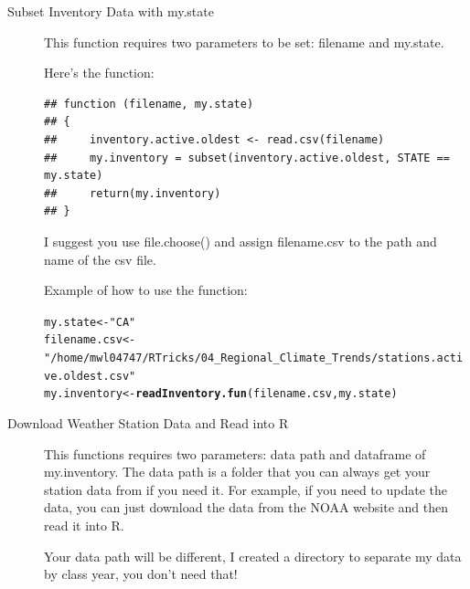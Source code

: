 \documentclass{article}\usepackage[]{graphicx}\usepackage[]{xcolor}
\makeatletter
\newcommand{\hlstr}[1]{\textcolor[rgb]{0.192,0.494,0.8}{#1}}%
\newcommand{\hlstd}[1]{\textcolor[rgb]{0.345,0.345,0.345}{#1}}%
\newcommand{\hlkwb}[1]{\textcolor[rgb]{0.69,0.353,0.396}{#1}}%
\newcommand{\hlkwd}[1]{\textcolor[rgb]{0.737,0.353,0.396}{\textbf{#1}}}%
\newenvironment{kframe}{%
 \def\at@end@of@kframe{}%
 \ifinner\ifhmode%
  \def\at@end@of@kframe{\end{minipage}}%
  \begin{minipage}{\columnwidth}%
 \fi\fi%
 \def\FrameCommand##1{\hskip\@totalleftmargin \hskip-\fboxsep
 \colorbox{shadecolor}{##1}\hskip-\fboxsep
     \hskip-\linewidth \hskip-\@totalleftmargin \hskip\columnwidth}%
 \MakeFramed {\advance\hsize-\width
   \@totalleftmargin\z@ \linewidth\hsize
   \@setminipage}}%
 {\par\unskip\endMakeFramed%
 \at@end@of@kframe}
\newenvironment{knitrout}{}{} %
\makeatother
\begin{document}
\begin{description}

\item[Subset Inventory Data with my.state]  

This function requires two parameters to be set: filename and my.state. 

Here's the function:

\begin{knitrout}
\color{fgcolor}\begin{kframe}
\begin{verbatim}
## function (filename, my.state) 
## {
##     inventory.active.oldest <- read.csv(filename)
##     my.inventory = subset(inventory.active.oldest, STATE == my.state)
##     return(my.inventory)
## }
\end{verbatim}
\end{kframe}
\end{knitrout}

I suggest you use file.choose() and assign filename.csv to the path and name of the csv file. 

Example of how to use the function:

\begin{knitrout}
\color{fgcolor}\begin{kframe}
\begin{alltt}
\hlstd{my.state} \hlkwb{<-} \hlstr{"CA"}
\hlstd{filename.csv} \hlkwb{<-} \hlstr{"/home/mwl04747/RTricks/04_Regional_Climate_Trends/stations.active.oldest.csv"}
\hlstd{my.inventory} \hlkwb{<-} \hlkwd{readInventory.fun}\hlstd{(filename.csv, my.state)}
\end{alltt}
\end{kframe}
\end{knitrout}


\item[Download Weather Station Data and Read into R]

This functions requires two parameters: data path and dataframe of my.inventory. The data path is a folder that you can always get your station data from if you need it. For example, if you need to update the data, you can just download the data from the NOAA website and then read it into R. 

Your data path will be different, I created a directory to separate my data by class year, you don't need that!


\end{description}
\end{document}
